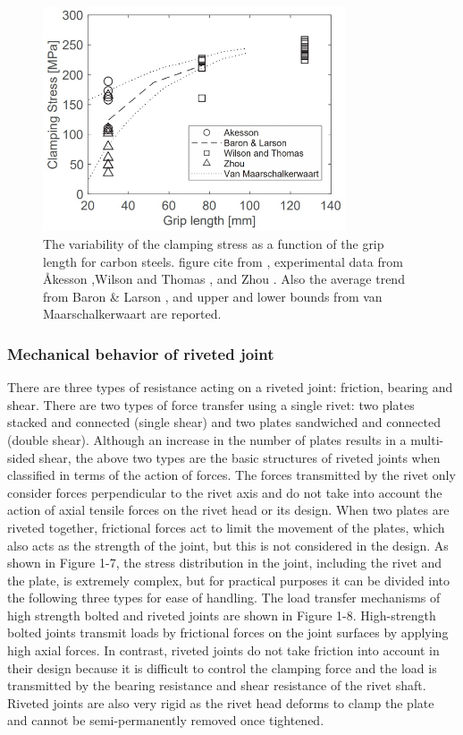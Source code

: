 \begin{figure}
    \centering
    \includegraphics[width=0.8\textwidth]{imgs/ch2/preload-rivet.pdf}
    \caption{The variability of the clamping stress as a function of the grip length for carbon steels. figure cite from \cite{Leonetti2020RivetBridges}, experimental data from Åkesson \cite{Akesson2010},Wilson and Thomas \cite{Wilson1938FatigueJoints}, and Zhou \cite{Zhou1994FatigueMembers}. Also the average trend from Baron \& Larson \cite{Baron1953TheJoints}, and upper and lower bounds from van Maarschalkerwaart \cite{VanMaarschalkerwaart1982FatigueJoints} are reported.}
    \label{fig-preload-rivet}
\end{figure}


\subsubsection{Mechanical behavior of riveted joint}

There are three types of resistance acting on a riveted joint: friction, bearing and shear. There are two types of force transfer using a single rivet: two plates stacked and connected (single shear) and two plates sandwiched and connected (double shear). Although an increase in the number of plates results in a multi-sided shear, the above two types are the basic structures of riveted joints when classified in terms of the action of forces. The forces transmitted by the rivet only consider forces perpendicular to the rivet axis and do not take into account the action of axial tensile forces on the rivet head or its design. When two plates are riveted together, frictional forces act to limit the movement of the plates, which also acts as the strength of the joint, but this is not considered in the design. As shown in Figure 1-7, the stress distribution in the joint, including the rivet and the plate, is extremely complex, but for practical purposes it can be divided into the following three types for ease of handling. The load transfer mechanisms of high strength bolted and riveted joints are shown in Figure 1-8. High-strength bolted joints transmit loads by frictional forces on the joint surfaces by applying high axial forces. In contrast, riveted joints do not take friction into account in their design because it is difficult to control the clamping force and the load is transmitted by the bearing resistance and shear resistance of the rivet shaft. Riveted joints are also very rigid as the rivet head deforms to clamp the plate and cannot be semi-permanently removed once tightened.


